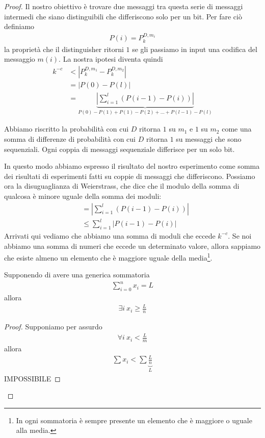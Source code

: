 \begin{proof}
Il nostro obiettivo è trovare due messaggi tra questa serie di messaggi intermedi che siano distinguibili che differiscono solo per un bit. Per fare ciò definiamo
\begin{align*}
    P(i) = P_k^{D, m_i}
\end{align*}
\noindent la proprietà che il distinguisher ritorni $1$ se gli passiamo in input una codifica del messaggio $m(i)$. La nostra ipotesi diventa quindi
\begin{align*}
    k^{-c} &< \left|P_{k}^{D, m_1} - P_{k}^{D, m_2}\right|\\
            &= \left|P(0) - P(l)\right|\\
            &= \underbrace{\left|\sum^l _{i=1}(P(i-1) - P(i))\right|}_{P(0) - P(1)
                                                        + P(1) - P(2)
                                                        + ...
                                                        + P(l-1) - P(l)}
\end{align*}

\noindent Abbiamo riscritto la probabilità con cui $D$ ritorna $1$ su $m_1$ e $1$ su $m_2$ come una somma di differenze di probabilità con cui $D$ ritorna $1$ su messaggi che sono sequenziali. Ogni coppia di messaggi sequenziale differisce per un solo bit. 

In questo modo abbiamo espresso il risultato del nostro esperimento come somma dei risultati di esperimenti fatti su coppie di messaggi che differiscono. Possiamo ora la disuguaglianza di Weierstrass, che dice che il modulo della somma di qualcosa è minore uguale della somma dei moduli:
\begin{align*}
    &= \left|\sum^l _{i=1}(P(i-1) - P(i))\right|\\
    &\le \sum^l_{i=1} \left| P(i-1) - P(i)\right|
\end{align*}
\indent Arrivati qui vediamo che abbiamo una somma di moduli che eccede $k^{-c}$. Se noi abbiamo una somma di numeri che eccede un determinato valore, allora sappiamo che esiste almeno un elemento che è maggiore uguale della media\footnote{In ogni sommatoria è sempre presente un elemento che è maggiore o uguale alla media.}. 

\begin{definition}
Supponendo di avere una generica sommatoria 
\begin{align*}
    \sum^n_{i=0} x_i = L
\end{align*}
\noindent allora 
\begin{align*}
    \exists i \ x_i \ge \frac{L}{n}
\end{align*}
\end{definition}
\begin{proof}
Supponiamo per assurdo
\begin{align*}
    \forall i \ x_i < \frac{L}{m}
\end{align*}
\noindent allora
\begin{align*}
    \sum x_i < \sum \underbrace{\frac{L}{n}}_{L} 
\end{align*}
\noindent IMPOSSIBILE
\end{proof}


\end{proof}

